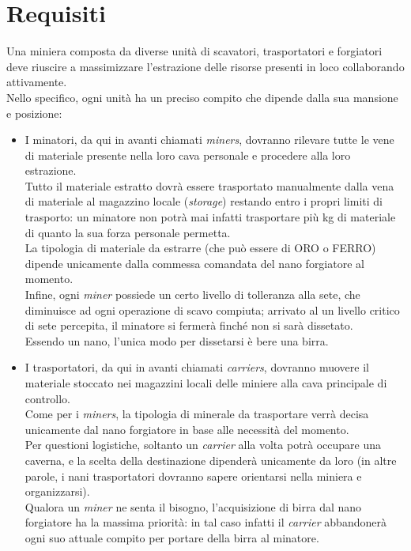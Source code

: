 \documentclass{llncs}
\begin{document}
\section{Requisiti}
Una miniera composta da diverse unità di scavatori, trasportatori e forgiatori deve riuscire a massimizzare l'estrazione delle risorse presenti in loco collaborando attivamente.\\
Nello specifico, ogni unità ha un preciso compito che dipende dalla sua mansione e posizione:
\begin{itemize}
\item I minatori, da qui in avanti chiamati \textit{miners}, dovranno rilevare tutte le vene di materiale presente nella loro cava personale e procedere alla loro estrazione.\\
Tutto il materiale estratto dovrà essere trasportato manualmente dalla vena di materiale al magazzino locale (\textit{storage}) restando entro i propri limiti di trasporto: un minatore non potrà mai infatti trasportare più kg di materiale di quanto la sua forza personale permetta.\\
La tipologia di materiale da estrarre (che può essere di ORO o FERRO) dipende unicamente dalla commessa comandata del nano forgiatore al momento.\\
Infine, ogni \textit{miner} possiede un certo livello di tolleranza alla sete, che diminuisce ad ogni operazione di scavo compiuta; arrivato al un livello critico di sete percepita, il minatore si fermerà finché non si sarà dissetato.\\
Essendo un nano, l'unica modo per dissetarsi è bere una birra.\\
\item I trasportatori, da qui in avanti chiamati \textit{carriers}, dovranno muovere il materiale stoccato nei magazzini locali delle miniere alla cava principale di controllo.\\Come per i \textit{miners}, la tipologia di minerale da trasportare verrà decisa unicamente dal nano forgiatore in base alle necessità del momento.\\
Per questioni logistiche, soltanto un \textit{carrier} alla volta potrà occupare una caverna, e la scelta della destinazione dipenderà unicamente da loro (in altre parole, i nani trasportatori dovranno sapere orientarsi nella miniera e organizzarsi).\\
Qualora un \textit{miner} ne senta il bisogno, l'acquisizione di birra dal nano forgiatore ha la massima priorità: in tal caso infatti il \textit{carrier} abbandonerà ogni suo attuale compito per portare della birra al minatore.\\

\end{itemize}
\end{document}
